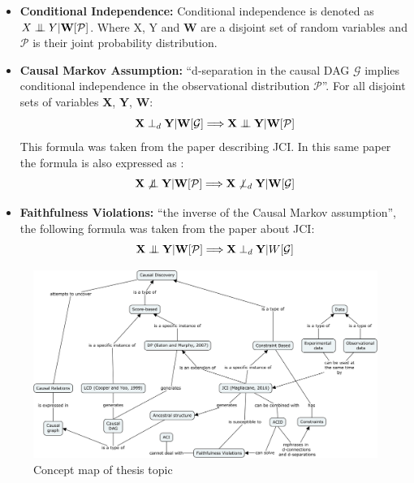 \documentclass[11pt]{article}
\newcommand{\bigCI}{\mathrel{\text{{$\perp\mkern-10mu\perp$}}}}
\begin{document}
\begin{itemize}
    \item \textbf{Conditional Independence:} Conditional independence is denoted as $X \bigCI Y \vert \textbf{W}[\mathcal{P}]$. Where X, Y and \textbf{W} are a disjoint set of random variables and $\mathcal{P}$ is their joint probability distribution.
    \item \textbf{Causal Markov Assumption:} ``d-separation in the causal DAG $\mathcal{G}$ implies conditional independence in the observational distribution $\mathcal{P}$''\cite[p.~3]{jci}. For all disjoint sets of variables \textbf{X}, \textbf{Y}, \textbf{W}:
    $$ \textbf{X} \perp_d \textbf{Y} \vert \textbf{W} [\mathcal{G}] \Longrightarrow \textbf{X} \bigCI \textbf{Y} \vert \textbf{W} [\mathcal{P}] $$
    This formula was taken from the paper describing JCI\cite[p.~3]{jci}. In this same paper the formula is also expressed as :
    $$ \textbf{X} \not \bigCI \textbf{Y} \vert \textbf{W}[\mathcal{P}] \Longrightarrow \textbf{X} \not \perp_d \textbf{Y} \vert \textbf{W} [\mathcal{G}] $$\cite[p.~3]{jci}
    \item \textbf{Faithfulness Violations:} ``the inverse of the Causal Markov assumption'', the following formula was taken from the paper about JCI\cite[p.~4]{jci}:
    $$ \textbf{X} \bigCI \textbf{Y} \vert \textbf{W}[\mathcal{P}] \Longrightarrow \textbf{X} \perp_d \textbf{Y} \vert W [\mathcal{G}] $$
\end{itemize}

\begin{figure}[h!]
    \centering
    \includegraphics[width=\textwidth]{assignment3_cmap.png}
    \caption{Concept map of thesis topic}
    \label{fig:cmap}
\end{figure}

\end{document}
